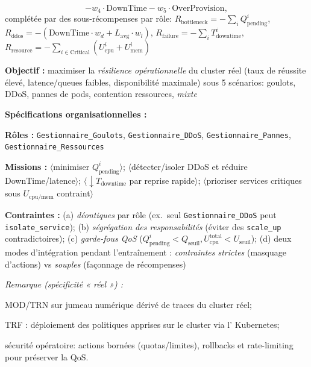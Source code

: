\begin{enumerate*}[label={\roman*)}, itemjoin={;\quad}]
\[        -w_4\cdot \text{DownTime}
        -w_5\cdot \text{OverProvision},
    \]
    complétée par des sous-récompenses par rôle:
    \(R_{\text{bottleneck}}=-\sum_i Q_{\text{pending}}^i\),
    \(R_{\text{ddos}}=-(\text{DownTime}\cdot w_d+L_{\text{avg}}\cdot w_l)\),
    \(R_{\text{failure}}=-\sum_i T_{\text{downtime}}^i\),
    \(R_{\text{resource}}=-\sum_{i\in\text{Critical}}(U_{\text{cpu}}^i+U_{\text{mem}}^i)\)
    \item \textbf{Objectif :} maximiser la \emph{résilience opérationnelle} du cluster réel (taux de réussite élevé, latence/queues faibles, disponibilité maximale) sous 5 scénarios: goulots, DDoS, pannes de pods, contention ressources, \emph{mixte}
\end{enumerate*}

\noindent\textbf{Spécifications organisationnelles :}
\begin{enumerate*}[label={\roman*)}, itemjoin={;\quad}]
    \item \textbf{Rôles :} \texttt{Gestionnaire\_Goulots}, \texttt{Gestionnaire\_DDoS}, \texttt{Gestionnaire\_Pannes}, \texttt{Gestionnaire\_Ressources}
    \item \textbf{Missions :}
    \(\langle\)minimiser \(Q_{\text{pending}}^i\)\(\rangle\);
    \(\langle\)détecter/isoler DDoS et réduire DownTime/latence\(\rangle\);
    \(\langle\)\(\downarrow T_{\text{downtime}}\) par reprise rapide\(\rangle\);
    \(\langle\)prioriser services critiques sous \(U_{\text{cpu/mem}}\) contraint\(\rangle\)
    \item \textbf{Contraintes :}
    (a) \emph{déontiques} par rôle (ex.~seul \texttt{Gestionnaire\_DDoS} peut \texttt{isolate\_service});
    (b) \emph{ségrégation des responsabilités} (éviter des \texttt{scale\_up} contradictoires);
    (c) \emph{garde-fous QoS} (\(Q_{\text{pending}}^i<Q_{\text{seuil}}, U_{\text{cpu}}^{\text{total}}<U_{\text{seuil}}\));
    (d) deux modes d’intégration pendant l’entraînement : \textit{contraintes strictes} (masquage d’actions) vs \textit{souples} (façonnage de récompenses)
\end{enumerate*}

\medskip
\noindent\textit{Remarque (spécificité « réel ») :}
\begin{enumerate*}[label={--}, itemjoin={\quad}]
    \item \textsc{MOD/TRN} sur jumeau numérique dérivé de traces du cluster réel;
    \item \textsc{TRF} : déploiement des politiques apprises sur le cluster via l’ Kubernetes;
    \item sécurité opératoire: actions bornées (quotas/limites), rollbacks et rate-limiting pour préserver la QoS.
\end{enumerate*}

